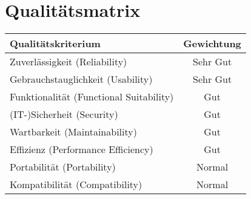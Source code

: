 \section{Qualitätsmatrix}
\begin{center}
    \begin{tabular}{ |l|c| }

        \hline
        \textbf{Qualitätskriterium} & \textbf{Gewichtung}  \\ \hline
        Zuverlässigkeit (Reliability) & \cellcolor[HTML]{0040FF}Sehr Gut\\ 
        Gebrauchstauglichkeit (Usability) & \cellcolor[HTML]{0040FF}Sehr Gut\\ 
        Funktionalität (Functional Suitability) & \cellcolor[HTML]{2E64FE}Gut\\ 
        (IT-)Sicherheit (Security) & \cellcolor[HTML]{2E64FE}Gut\\ 
        Wartbarkeit (Maintainability) & \cellcolor[HTML]{2E64FE}Gut\\ 
        Effizienz (Performance Efficiency) & \cellcolor[HTML]{2E64FE}Gut\\ 
        Portabilität (Portability) & \cellcolor[HTML]{819FF7}Normal\\ 
        Kompatibilität (Compatibility) & \cellcolor[HTML]{819FF7}Normal\\ \hline
        \end{tabular}
    \end{center}
